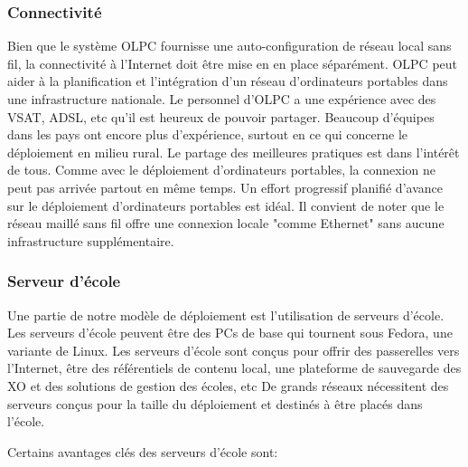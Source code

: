 \documentclass[11pt]{article}
\begin{document}
\subsubsection{Connectivité}
\label{sec-9-4-2}



Bien que le système OLPC fournisse une auto-configuration de réseau local
sans fil, la connectivité à l'Internet doit être mise en en place
séparément. OLPC peut aider à la planification et l'intégration d'un réseau
d'ordinateurs portables dans une infrastructure nationale. Le personnel
d'OLPC a une expérience avec des VSAT, ADSL, etc qu'il est heureux de
pouvoir partager. Beaucoup d'équipes dans les pays ont encore plus
d'expérience, surtout en ce qui concerne le déploiement en milieu rural. Le
partage des meilleures pratiques est dans l'intérêt de tous. Comme avec le
déploiement d'ordinateurs portables, la connexion ne peut pas arrivée
partout en même temps. Un effort progressif planifié d'avance sur le
déploiement d'ordinateurs portables est idéal. Il convient de noter que le
réseau maillé sans fil offre une connexion locale "comme Ethernet" sans
aucune infrastructure supplémentaire.
\subsubsection{Serveur d'école}
\label{sec-9-4-3}



Une partie de notre modèle de déploiement est l'utilisation de serveurs
d'école. Les serveurs d'école peuvent être des PCs de base qui tournent
sous Fedora, une variante de Linux. Les serveurs d'école sont conçus pour
offrir des passerelles vers l'Internet, être des référentiels de contenu
local, une plateforme de sauvegarde des XO et des solutions de gestion des
écoles, etc De grands réseaux nécessitent des serveurs conçus pour la
taille du déploiement et destinés à être placés dans l'école.


Certains avantages clés des serveurs d'école sont:
\end{document}
